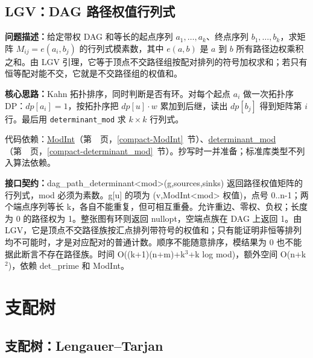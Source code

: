 \section{LGV：DAG 路径权值行列式}\label{compact-dag_path_determinant}

\noindent\textbf{问题描述：}\allowbreak 给定带权 DAG 和等长的起点序列 $a_1,\dots,a_k$、终点序列 $b_1,\dots,b_k$，求矩阵 $M_{ij}=e(a_i,b_j)$ 的行列式模素数，其中 $e(a,b)$ 是 $a$ 到 $b$ 所有路径边权乘积之和。由 LGV 引理，它等于顶点不交路径组按配对排列的符号加权求和；若只有恒等配对能不交，它就是不交路径组的权值和。

\textbf{核心思路：}\allowbreak Kahn 拓扑排序，同时判断是否有环。对每个起点 $a_i$ 做一次拓扑序 DP：$dp[a_i]=1$，按拓扑序把 $dp[u]\cdot w$ 累加到后继，读出 $dp[b_j]$ 得到矩阵第 $i$ 行。最后用 \texttt{determinant\_mod} 求 $k\times k$ 行列式。

代码依赖：\hyperref[compact-ModInt]{ModInt}（第~\pageref{compact-ModInt}~页，\ref{compact-ModInt}~节）、\hyperref[compact-determinant_mod]{determinant\_\allowbreak{}mod}（第~\pageref{compact-determinant_mod}~页，\ref{compact-determinant_mod}~节）。抄写时一并准备；标准库类型不列入算法依赖。

{\sloppy{}\noindent\textbf{接口契约：}dag\_path\_determinant<mod>(g,sources,sinks) 返回路径权值矩阵的行列式，mod 必须为素数。g[u] 的项为 (v,ModInt<mod> 权值)，点号 0..n-1；两个端点序列等长 k，各自不能重复，但可相互重叠。允许重边、零权、负权；长度为 0 的路径权为 1。整张图有环则返回 nullopt，空端点族在 DAG 上返回 1。由 LGV，它是顶点不交路径族按汇点排列带符号的权值和；只有能证明非恒等排列均不可能时，才是对应配对的普通计数。顺序不能随意排序，模结果为 0 也不能据此断言不存在路径族。时间 O((k+1)(n+m)+k$^{3}$+k log mod)，额外空间 O(n+k$^{2}$)，依赖 det\_prime 和 ModInt。\par}

\Needspace{426pt}



\newpage



\Needspace{180pt}

\chapter{支配树}

\section{支配树：Lengauer--Tarjan}\label{compact-DominatorTree}


